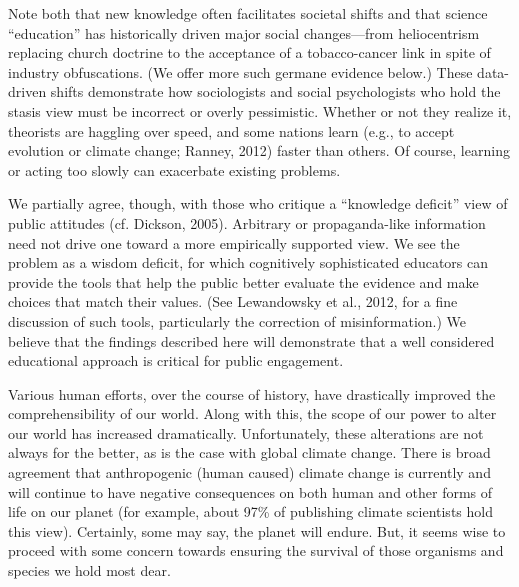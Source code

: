 Note both that new knowledge often facilitates societal shifts and that science
``education'' has historically driven major social changes—from heliocentrism
replacing church doctrine to the acceptance of a tobacco-cancer link in spite of
industry obfuscations. (We offer more such germane evidence below.) These
data-driven shifts demonstrate how sociologists and social psychologists who
hold the stasis view must be incorrect or overly pessimistic. Whether or not
they realize it, theorists are haggling over speed, and some nations learn
(e.g., to accept evolution or climate change; Ranney, 2012) faster than others.
Of course, learning or acting too slowly can exacerbate existing problems.

We partially agree, though, with those who critique a ``knowledge deficit'' view
of public attitudes (cf. Dickson, 2005). Arbitrary or propaganda-like
information need not drive one toward a more empirically supported view. We see
the problem as a wisdom deficit, for which cognitively sophisticated educators
can provide the tools that help the public better evaluate the evidence and make
choices that match their values. (See Lewandowsky et al., 2012, for a fine
discussion of such tools, particularly the correction of misinformation.) We
believe that the findings described here will demonstrate that a well considered
educational approach is critical for public engagement.



Various human efforts, over the course of history, have drastically improved the
comprehensibility of our world. Along with this, the scope of our power to alter
our world has increased dramatically. Unfortunately, these alterations are not
always for the better, as is the case with global climate change. There is broad
agreement that anthropogenic (human caused) climate change is currently and will
continue to have negative consequences on both human and other forms of life on
our planet (for example, about 97\% of publishing climate scientists hold this
view). Certainly, some may say, the planet will endure. But, it seems wise
to proceed with some concern towards ensuring the survival of those organisms
and species we hold most dear.

